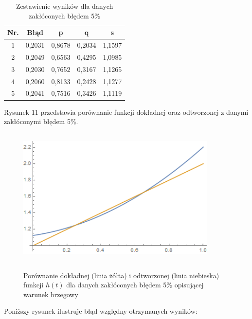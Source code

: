\documentclass[twoside]{projektInzynierskiMS1}
\begin{document}
\begin{table}[htbp]\centering
\def\sym#1{\ifmmode^{#1}\else\(^{#1}\)\fi}
\caption{Zestawienie wyników dla danych zakłóconych błędem 5\%}
\renewcommand\arraystretch{1.333}
\begin{tabular}{|c|c|c|c|c|} 
                  \hline
\textbf{Nr.}& \textbf{Błąd} &\textbf{p} & \textbf{q} & \textbf{s}\\ \hline
1& 0,2031 & 0,8678 & 0,2034 & 1,1597 \\ \hline 
2& 0,2049 & 0,6563 & 0,4295 & 1,0985 \\ \hline 
3& 0,2030 & 0,7652 & 0,3167 & 1,1265 \\ \hline 
4& 0,2060 & 0,8133 & 0,2428 & 1,1277 \\ \hline 
5& 0,2041 & 0,7516 & 0,3426 & 1,1119 \\ \hline 
\end{tabular}
\end{table}
\newpage
Rysunek 11 przedstawia porównanie funkcji dokładnej oraz odtworzonej z danymi zakłóconymi błędem 5\%.

\begin{figure}[H]
\begin{center}
		\includegraphics[height=7cm, width=10cm]{pics/5reconstruction.png}\\
	\caption{Porównanie dokładnej (linia żółta) i odtworzonej (linia niebieska) funkcji $h(t)$ dla danych zakłóconych błędem 5\% opisującej warunek brzegowy}
\end{center}
\end{figure}

Poniższy rysunek ilustruje błąd względny otrzymanych wyników:
\end{document}
